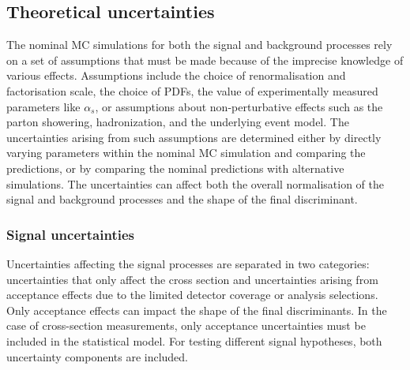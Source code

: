 \subsection{Theoretical uncertainties}
The nominal MC simulations for both the signal and background processes rely on a set of assumptions that must be made because of the imprecise knowledge of various effects. Assumptions include the choice of renormalisation and factorisation scale, the choice of PDFs, the value of experimentally measured parameters like $\alpha_s$, or assumptions about non-perturbative effects such as the parton showering, hadronization, and the underlying event model. 
The uncertainties arising from such assumptions are determined either by directly varying parameters within the nominal MC simulation and comparing the predictions, or by comparing the nominal predictions with alternative simulations. 
The uncertainties can affect both the overall normalisation of the signal and background processes and the shape of the final discriminant.  

\subsubsection{Signal uncertainties}
Uncertainties affecting the signal processes are separated in two categories: uncertainties that only affect the cross section and uncertainties arising from acceptance effects due to the limited detector coverage or analysis selections. Only acceptance effects can impact the shape of the final discriminants. 
In the case of cross-section measurements, only acceptance uncertainties must be included in the statistical model. 
For testing different signal hypotheses, both uncertainty components are included. 

